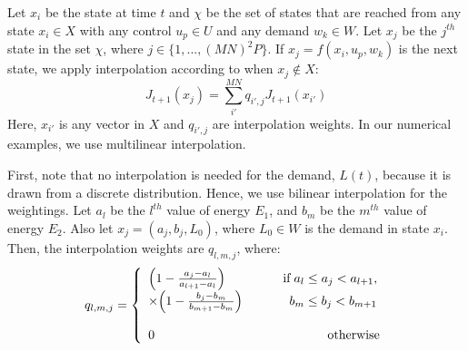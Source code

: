\documentclass[conference]{IEEEtran}
\begin{document}
Let $x_{i}$ be the state at time $t$ and $\chi$ be the set of states that are reached from any state $x_{i}\in X$ with any control $u_{p}\in U$ and any demand $w_{k}\in W$. Let $x_{j}$ be the $j^{th}$ state in the set $\chi$, where $j\in \{1,...,(MN)^{2}P\}$. If $x_{j}=f(x_{i},u_{p},w_{k})$ is the next state, we apply interpolation according to \cite[p.~319]{MultiLinInterp} when $x_{j}\not\in X$:
\begin{equation} \label{eq:InterpMap}
	J_{t+1}(x_{j})=\sum_{i'}^{MN}q_{i',j}J_{t+1}(x_{i'})
\end{equation} Here, $x_{i'}$ is any vector in $X$ and $q_{i',j}$ are interpolation weights. In our numerical examples, we use multilinear interpolation.

First, note that no interpolation is needed for the demand, $L(t)$, because it is drawn from a discrete distribution. Hence, we use bilinear interpolation for the weightings. Let $a_{l}$ be the $l^{th}$ value of energy $E_{1}$, and $b_{m}$ be the $m^{th}$ value of energy $E_{2}$. Also let $x_{j}=(a_{j},b_{j},L_{0})$, where $L_{0}\in W$ is the demand in state $x_{i}$. %
Then, the interpolation weights are $q_{l,m,j}$, where:
\begin{displaymath}q_{l,m,j}=
\left\{
\begin{array}{l}
\Big(1-\frac{a_{j}-a_{l}}{a_{l+1}-a_{l}}\Big) \hspace{1.6cm} \text{if} \hspace{0.1cm} a_{l}\leq a_{j}< a_{l+1},\\ \times \Big(1-\frac{b_{j}-b_{m}}{b_{m+1}-b_{m}}\Big) \hspace{1.3cm}b_{m}\leq b_{j}< b_{m+1}\\\\
0		   \hspace{4.8cm} \text{otherwise}
\end{array}
\right.
\end{displaymath}
\end{document}
